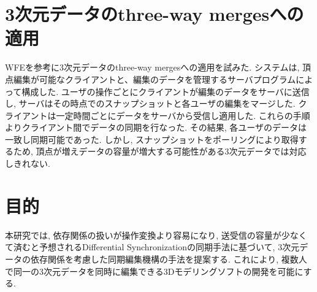 \section{3次元データのthree-way mergesへの適用}
WFEを参考に3次元データのthree-way mergesへの適用を試みた.
システムは, 頂点編集が可能なクライアントと、編集のデータを管理するサーバプログラムによって構成した. ユーザの操作ごとにクライアントが編集のデータをサーバに送信し, サーバはその時点でのスナップショットと各ユーザの編集をマージした. クライアントは一定時間ごとにデータをサーバから受信し適用した. これらの手順よりクライアント間でデータの同期を行なった. その結果, 各ユーザのデータは一致し同期可能であった. しかし, スナップショットをポーリングにより取得するため, 頂点が増えデータの容量が増大する可能性がある3次元データでは対応しきれない.
\section{目的}
本研究では, 依存関係の扱いが操作変換より容易になり, 送受信の容量が少なくて済むと予想されるDifferential Synchronizationの同期手法に基づいて, 3次元データの依存関係を考慮した同期編集機構の手法を提案する.
これにより, 複数人で同一の3次元データを同時に編集できる3Dモデリングソフトの開発を可能にする.
